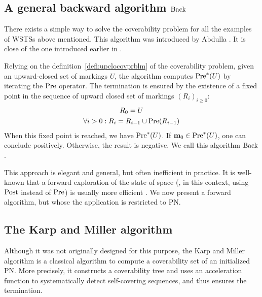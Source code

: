 \subsection{A general backward algorithm $\operatorname{Back}$}
\label{sec:backward-algorithm}

There exists a simple way to solve the coverability problem for all the examples of \acp{WSTS} above mentioned.
This algorithm was introduced by Abdulla  \citep{Abdulla96}.
It is close of the one introduced earlier in \cite{Finkel90}.

Relying on the definition~\ref{defi:upclocovprblm} of the coverability problem, given an upward-closed set of markings $U$, the algorithm computes $\operatorname{Pre}^*(U)$ by iterating the $\operatorname{Pre}$ operator.
The termination is ensured by the existence of a fixed point in the sequence of upward closed set of markings $(R_i)_{i \geq 0}$:
\begin{gather*}
  R_0 = U \\
  \forall i > 0 : R_i = R_{i-1} \cup \operatorname{Pre}(R_{i-1})
\end{gather*}
When this fixed point is reached, we have $\operatorname{Pre}^*(U)$.
If $\mathbf{m}_0 \in \operatorname{Pre}^*(U)$, one can conclude positively.
Otherwise, the result is negative.
We call this algorithm $\operatorname{Back}$.

This approach is elegant and general, but often inefficient in practice.
It is well-known that a forward exploration of the state of space (, in this context, using $\operatorname{Post}$ instead of $\operatorname{Pre}$) is usually more efficient \citep{Henzinger98}.
We now present a forward algorithm, but whose the application is restricted to \ac{PN}.

\subsection{The Karp and Miller algorithm}

Although it was not originally designed for this purpose, the Karp and Miller algorithm \cite{Karp69} is a classical algorithm to compute a coverability set of an initialized \ac{PN}.
More precisely, it constructs a coverability tree and uses an acceleration function to systematically detect self-covering sequences, and thus ensures the termination.

